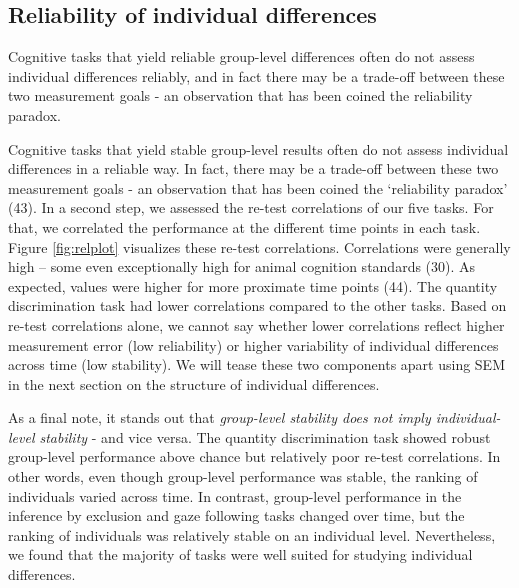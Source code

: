 \documentclass[
  man,floatsintext]{apa6}
\begin{document}
\hypertarget{reliability-of-individual-differences}{%
\subsection{Reliability of individual differences}\label{reliability-of-individual-differences}}

Cognitive tasks that yield reliable group-level differences often do not assess individual differences reliably, and in fact there may be a trade-off between these two measurement goals - an observation that has been coined the reliability paradox.

Cognitive tasks that yield stable group-level results often do not assess individual differences in a reliable way. In fact, there may be a trade-off between these two measurement goals - an observation that has been coined the `reliability paradox' (43). In a second step, we assessed the re-test correlations of our five tasks. For that, we correlated the performance at the different time points in each task. Figure \ref{fig:relplot} visualizes these re-test correlations. Correlations were generally high -- some even exceptionally high for animal cognition standards (30). As expected, values were higher for more proximate time points (44). The quantity discrimination task had lower correlations compared to the other tasks. Based on re-test correlations alone, we cannot say whether lower correlations reflect higher measurement error (low reliability) or higher variability of individual differences across time (low stability). We will tease these two components apart using SEM in the next section on the structure of individual differences.

As a final note, it stands out that \emph{group-level stability does not imply individual-level stability} - and vice versa. The quantity discrimination task showed robust group-level performance above chance but relatively poor re-test correlations. In other words, even though group-level performance was stable, the ranking of individuals varied across time. In contrast, group-level performance in the inference by exclusion and gaze following tasks changed over time, but the ranking of individuals was relatively stable on an individual level. Nevertheless, we found that the majority of tasks were well suited for studying individual differences.
\end{document}
